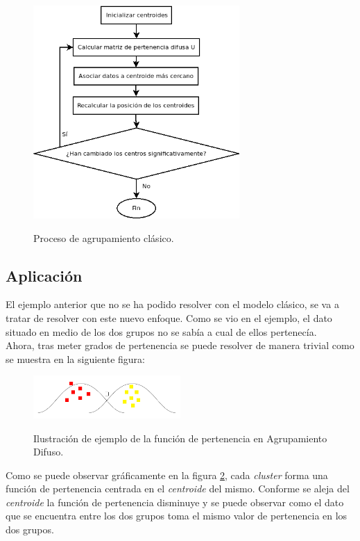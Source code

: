 \documentclass[]{report}
\begin{document}
			\begin{figure}[h]
				\centering
				\includegraphics[width=0.7\textwidth]{agrupamiento-difuso.png}
				\label{agrupamiento_difuso}
				\caption{Proceso de agrupamiento clásico.}
			\end{figure}
		
			\subsection{Aplicación}
						
				El ejemplo anterior que no se ha podido resolver con el modelo clásico, se va a tratar de resolver con este nuevo enfoque. Como se vio en el ejemplo, el dato situado en medio de los dos grupos no se sabía a cual de ellos pertenecía.\\
				
				Ahora, tras meter grados de pertenencia se puede resolver de manera trivial como se muestra en la siguiente figura:
				
				\begin{figure}[h]
					\centering
					\includegraphics[width=0.5\textwidth]{clustering_difuso.jpg}
					\label{clustering_difuso}
					\caption{Ilustración de ejemplo de la función de pertenencia en Agrupamiento Difuso.}
				\end{figure}
			
				Como se puede observar gráficamente en la figura \ref{clustering_difuso}, cada \textit{cluster} forma una función de pertenencia centrada en el \textit{centroide} del mismo. Conforme se aleja del \textit{centroide} la función de pertenencia disminuye y se puede observar como el dato que se encuentra entre los dos grupos toma el mismo valor de pertenencia en los dos grupos.\\
				
\end{document}
